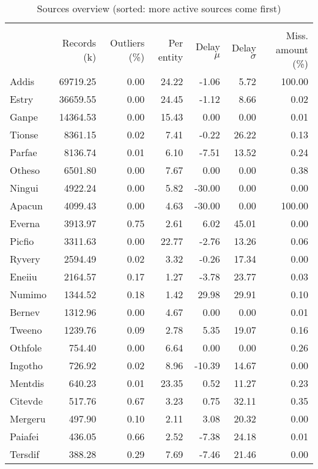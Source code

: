 \begin{table}[htbp!] \centering
\caption{Sources overview (sorted: more active sources come first)}
\label{tab:100_overview_sources}
\begin{tabular}{lrrrrrr}
\\[-1.8ex]\hline\hline \\[-1.8ex]
 & Records (k) & Outliers (\%) & Per entity & Delay $\mu$ & Delay $\sigma$ & Miss. amount (\%) \\
\midrule
Addis & 69719.25 & 0.00 & 24.22 & -1.06 & 5.72 & 100.00 \\
Estry & 36659.55 & 0.00 & 24.45 & -1.12 & 8.66 & 0.02 \\
Ganpe & 14364.53 & 0.00 & 15.43 & 0.00 & 0.00 & 0.01 \\
Tionse & 8361.15 & 0.02 & 7.41 & -0.22 & 26.22 & 0.13 \\
Parfae & 8136.74 & 0.01 & 6.10 & -7.51 & 13.52 & 0.24 \\
Otheso & 6501.80 & 0.00 & 7.67 & 0.00 & 0.00 & 0.38 \\
Ningui & 4922.24 & 0.00 & 5.82 & -30.00 & 0.00 & 0.00 \\
Apacun & 4099.43 & 0.00 & 4.63 & -30.00 & 0.00 & 100.00 \\
Everna & 3913.97 & 0.75 & 2.61 & 6.02 & 45.01 & 0.00 \\
Picfio & 3311.63 & 0.00 & 22.77 & -2.76 & 13.26 & 0.06 \\
Ryvery & 2594.49 & 0.02 & 3.32 & -0.26 & 17.34 & 0.00 \\
Eneiiu & 2164.57 & 0.17 & 1.27 & -3.78 & 23.77 & 0.03 \\
Numimo & 1344.52 & 0.18 & 1.42 & 29.98 & 29.91 & 0.10 \\
Bernev & 1312.96 & 0.00 & 4.67 & 0.00 & 0.00 & 0.01 \\
Tweeno & 1239.76 & 0.09 & 2.78 & 5.35 & 19.07 & 0.16 \\
Othfole & 754.40 & 0.00 & 6.64 & 0.00 & 0.00 & 0.26 \\
Ingotho & 726.92 & 0.02 & 8.96 & -10.39 & 14.67 & 0.00 \\
Mentdis & 640.23 & 0.01 & 23.35 & 0.52 & 11.27 & 0.23 \\
Citevde & 517.76 & 0.67 & 3.23 & 0.75 & 32.11 & 0.35 \\
Mergeru & 497.90 & 0.10 & 2.11 & 3.08 & 20.32 & 0.00 \\
Paiafei & 436.05 & 0.66 & 2.52 & -7.38 & 24.18 & 0.01 \\
Tersdif & 388.28 & 0.29 & 7.69 & -7.46 & 21.46 & 0.00 \\

\end{tabular}
\end{table}
